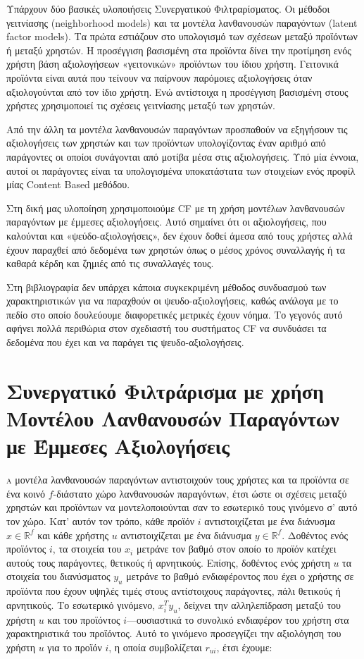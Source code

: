 Υπάρχουν δύο βασικές υλοποιήσεις Συνεργατικού Φιλτραρίσματος. Οι μέθοδοι γειτνίασης (neighborhood models) και τα μοντέλα λανθανουσών παραγόντων (latent factor models). Τα πρώτα εστιάζουν στο υπολογισμό των σχέσεων μεταξύ προϊόντων ή μεταξύ χρηστών. Η προσέγγιση βασισμένη στα προϊόντα δίνει την προτίμηση ενός χρήστη βάση αξιολογήσεων «γειτονικών» προϊόντων του ίδιου χρήστη. Γειτονικά προϊόντα είναι αυτά που τείνουν να παίρνουν παρόμοιες αξιολογήσεις όταν αξιολογούνται από τον ίδιο χρήστη. Ενώ αντίστοιχα η προσέγγιση βασισμένη στους χρήστες χρησιμοποιεί τις σχέσεις γειτνίασης μεταξύ των χρηστών. 

Από την άλλη τα μοντέλα λανθανουσών παραγόντων προσπαθούν να εξηγήσουν τις αξιολογήσεις των χρηστών και των προϊόντων υπολογίζοντας έναν αριθμό από παράγοντες οι οποίοι συνάγονται από μοτίβα μέσα στις αξιολογήσεις. Υπό μία έννοια, αυτοί οι παράγοντες είναι τα υπολογισμένα υποκατάστατα των στοιχείων ενός προφίλ μίας Content Based μεθόδου.

Στη δική μας υλοποίηση χρησιμοποιούμε CF με τη χρήση μοντέλων λανθανουσών παραγόντων με έμμεσες αξιολογήσεις. Αυτό σημαίνει ότι οι αξιολογήσεις, που καλούνται και «ψεύδο-αξιολογήσεις», δεν έχουν δοθεί άμεσα από τους χρήστες αλλά έχουν παραχθεί από δεδομένα των χρηστών όπως ο μέσος χρόνος συναλλαγής ή τα καθαρά κέρδη και ζημιές από τις συναλλαγές τους. 

Στη βιβλιογραφία δεν υπάρχει κάποια συγκεκριμένη μέθοδος συνδυασμού των χαρακτηριστικών για να παραχθούν οι ψευδο-αξιολογήσεις, καθώς ανάλογα με το πεδίο στο οποίο δουλεύουμε διαφορετικές μετρικές έχουν νόημα. Το γεγονός αυτό αφήνει πολλά περιθώρια στον σχεδιαστή του συστήματος CF να συνδυάσει τα δεδομένα που έχει και να παράγει τις ψευδο-αξιολογήσεις. 

\section{Συνεργατικό Φιλτράρισμα με χρήση Μοντέλου Λανθανουσών Παραγόντων με Έμμεσες Αξιολογήσεις
}

\lettrine[findent=2pt]{}{α} μοντέλα λανθανουσών παραγόντων αντιστοιχούν τους χρήστες και τα προϊόντα σε ένα κοινό $f$-διάστατο χώρο λανθανουσών παραγόντων, έτσι ώστε οι σχέσεις μεταξύ χρηστών και προϊόντων να μοντελοποιούνται σαν το εσωτερικό τους γινόμενο σ’ αυτό τον χώρο. Κατ’ αυτόν τον τρόπο, κάθε προϊόν $i$ αντιστοιχίζεται με ένα διάνυσμα $x \in \mathbb{R}^f$ και κάθε χρήστης $u$ αντιστοιχίζεται με ένα διάνυσμα $y \in \mathbb{R}^f$. Δοθέντος ενός προϊόντος $i$, τα στοιχεία του $x_i$ μετράνε τον βαθμό στον οποίο το προϊόν κατέχει αυτούς τους παράγοντες, θετικούς ή αρνητικούς. Επίσης, δοθέντος ενός χρήστη $u$ τα στοιχεία του διανύσματος $y_u$ μετράνε το βαθμό ενδιαφέροντος που έχει ο χρήστης σε προϊόντα που έχουν υψηλές τιμές στους αντίστοιχους παράγοντες, πάλι θετικούς ή αρνητικούς. Το εσωτερικό γινόμενο, $x_i^Ty_u$, δείχνει την αλληλεπίδραση μεταξύ του χρήστη $u$ και του προϊόντος $i$—ουσιαστικά το συνολικό ενδιαφέρον του χρήστη στα χαρακτηριστικά του προϊόντος. Αυτό το γινόμενο προσεγγίζει την αξιολόγηση του χρήστη $u$ για το προϊόν $i$, η οποία συμβολίζεται $r_{ui}$, έτσι έχουμε:


